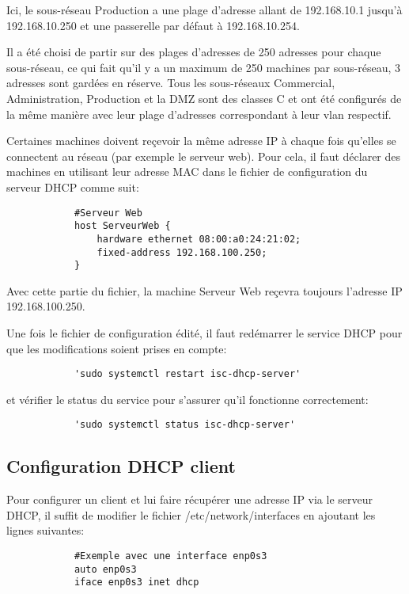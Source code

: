 \documentclass[a4paper,12pt]{report}
\begin{document}
            Ici, le sous-réseau Production a une plage d'adresse allant de 192.168.10.1 jusqu'à 192.168.10.250 et une passerelle par défaut à 192.168.10.254.

            Il a été choisi de partir sur des plages d'adresses de 250 adresses pour chaque sous-réseau, ce qui fait qu'il y a un maximum de 250 machines par sous-réseau, 3 adresses sont gardées en réserve.
            Tous les sous-réseaux Commercial, Administration, Production et la DMZ sont des classes C et ont été configurés de la même manière avec leur plage d'adresses correspondant à leur vlan respectif.

            Certaines machines doivent reçevoir la même adresse IP à chaque fois qu'elles se connectent au réseau (par exemple le serveur web).
            Pour cela, il faut déclarer des machines en utilisant leur adresse MAC dans le fichier de configuration du serveur DHCP comme suit:

            \begin{verbatim}
            #Serveur Web
            host ServeurWeb {
                hardware ethernet 08:00:a0:24:21:02;
                fixed-address 192.168.100.250;
            }
            \end{verbatim}

            Avec cette partie du fichier, la machine Serveur Web reçevra toujours l'adresse IP 192.168.100.250.

            Une fois le fichier de configuration édité, il faut redémarrer le service DHCP pour que les modifications soient prises en compte:
            \begin{verbatim}
            'sudo systemctl restart isc-dhcp-server'
            \end{verbatim}
            et vérifier le status du service pour s'assurer qu'il fonctionne correctement:
            \begin{verbatim}
            'sudo systemctl status isc-dhcp-server'
            \end{verbatim}

            \subsection{Configuration DHCP client}
            Pour configurer un client et lui faire récupérer une adresse IP via le serveur DHCP, il suffit de modifier le fichier /etc/network/interfaces en ajoutant les lignes suivantes:
            \begin{verbatim}
            #Exemple avec une interface enp0s3
            auto enp0s3
            iface enp0s3 inet dhcp
            \end{verbatim}
\end{document}
